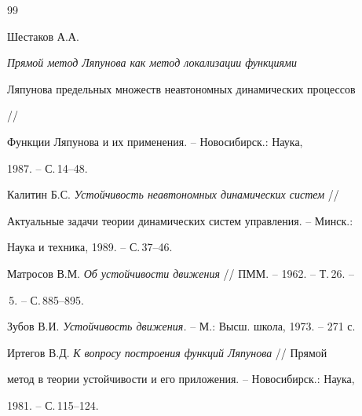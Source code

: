 \begin{thebibliography}{99}
 




Шестаков А.А. {\em Прямой метод Ляпунова как метод локализации функциями 


Ляпунова предельных множеств неавтономных динамических процессов} // 


Функции Ляпунова и их применения. -- Новосибирск.: Наука, 


1987. -- С.\,14--48. 


 




Калитин Б.С. {\em Устойчивость неавтономных динамических систем} // 


Актуальные задачи теории динамических систем управления. -- Минск.: 


Наука и техника, 1989. -- С.\,37--46. 


 




Матросов В.М. {\em Об устойчивости движения} // ПММ. -- 1962. -- Т.\,26. -- 


\No\,5. -- С.\,885--895. 


 




Зубов В.И. {\em Устойчивость движения.} -- М.: Высш. школа, 1973. -- 271 с. 


 




Иртегов В.Д. {\em К вопросу построения функций Ляпунова} // Прямой 


метод в теории устойчивости и его приложения. -- Новосибирск.: Наука, 


1981. -- С.\,115--124. 


 


 


\end{thebibliography} 


 


\vskip 2cm 


 






 


 


